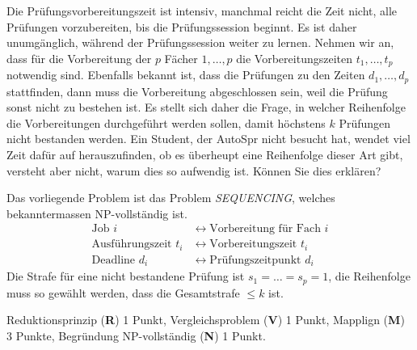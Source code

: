 Die Prüfungsvorbereitungszeit ist intensiv, manchmal reicht die Zeit nicht, 
alle Prüfungen vorzubereiten, bis die Prüfungssession beginnt.
Es ist daher unumgänglich, während der Prüfungssession weiter zu lernen.
Nehmen wir an, dass für die Vorbereitung der $p$ Fächer $1,\dots,p$
die Vorbereitungszeiten $t_1,\dots,t_p$ notwendig sind.
Ebenfalls bekannt ist, dass die Prüfungen zu den Zeiten $d_1,\dots,d_p$
stattfinden, dann muss die Vorbereitung abgeschlossen sein, weil die
Prüfung sonst nicht zu bestehen ist.
Es stellt sich daher die Frage, in welcher Reihenfolge die
Vorbereitungen durchgeführt werden sollen,
damit höchstens $k$ Prüfungen nicht bestanden werden.
Ein Student, der AutoSpr nicht besucht hat, wendet viel Zeit dafür auf
herauszufinden, ob es überheupt eine Reihenfolge dieser Art gibt,
versteht aber nicht, warum dies so aufwendig ist.
Können Sie dies erklären?


\begin{loesung}
Das vorliegende Problem ist das Problem \textit{SEQUENCING}, welches
bekanntermassen NP-vollständig ist.
\begin{align*}
\text{Job $i$}&\leftrightarrow\text{Vorbereitung für Fach $i$}
\\
\text{Ausführungszeit $t_i$}&\leftrightarrow\text{Vorbereitungszeit $t_i$}
\\
\text{Deadline $d_i$}&\leftrightarrow\text{Prüfungszeitpunkt $d_i$}
\end{align*}
Die Strafe für eine nicht bestandene Prüfung ist $s_1=\dots=s_p=1$,
die Reihenfolge muss so gewählt werden, dass die Gesamtstrafe $\le k$ 
ist.
\end{loesung}

\begin{bewertung}
Reduktionsprinzip ({\bf R}) 1 Punkt,
Vergleichsproblem  ({\bf V}) 1 Punkt,
Mapplign ({\bf M}) 3 Punkte,
Begründung NP-vollständig ({\bf N}) 1 Punkt.
\end{bewertung}


